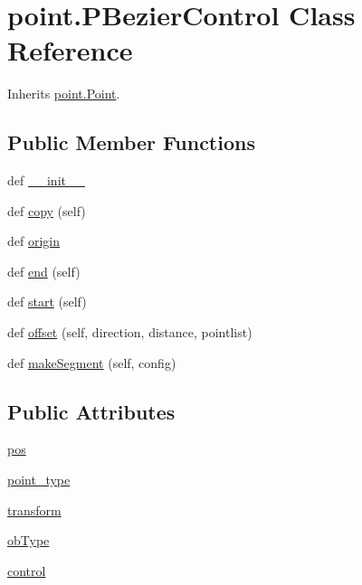 \hypertarget{classpoint_1_1_p_bezier_control}{}\section{point.\+P\+Bezier\+Control Class Reference}
\label{classpoint_1_1_p_bezier_control}


Inherits \hyperlink{classpoint_1_1_point}{point.\+Point}.

\subsection*{Public Member Functions}
\begin{DoxyCompactItemize}
\item 
def \hyperlink{classpoint_1_1_p_bezier_control_a4010a1feea03258f5a5f977cc28936f2}{\+\_\+\+\_\+init\+\_\+\+\_\+}
\item 
def \hyperlink{classpoint_1_1_p_bezier_control_a7a5460934307c34e9b15274e29e6bb07}{copy} (self)
\item 
def \hyperlink{classpoint_1_1_p_bezier_control_a3349853e6fcd933337a75ea6441367f0}{origin}
\item 
def \hyperlink{classpoint_1_1_p_bezier_control_a71571dd210c3101025c49821cc9678ac}{end} (self)
\item 
def \hyperlink{classpoint_1_1_p_bezier_control_a4f2bc163315c5bf277f793323c611e4b}{start} (self)
\item 
def \hyperlink{classpoint_1_1_p_bezier_control_ac576521c1d2dadc1b3cce50668f98724}{offset} (self, direction, distance, pointlist)
\item 
def \hyperlink{classpoint_1_1_p_bezier_control_a25e4e5c0386899c19f55f37aa143250a}{make\+Segment} (self, config)
\end{DoxyCompactItemize}
\subsection*{Public Attributes}
\begin{DoxyCompactItemize}
\item 
\hyperlink{classpoint_1_1_p_bezier_control_aea32847f414296d7838d90bc621fdcc1}{pos}
\item 
\hyperlink{classpoint_1_1_p_bezier_control_a10ff58a567e6a3fe7585d2b6dffc73c2}{point\+\_\+type}
\item 
\hyperlink{classpoint_1_1_p_bezier_control_ab8fbb1bca54765469d9c3a4b94ce6331}{transform}
\item 
\hyperlink{classpoint_1_1_p_bezier_control_a2e39a0d46d193e5fdc1024feaf7250e7}{ob\+Type}
\item 
\hyperlink{classpoint_1_1_p_bezier_control_afdb51ba474e73dd5eb0a281bb7b39bd8}{control}
\end{DoxyCompactItemize}


